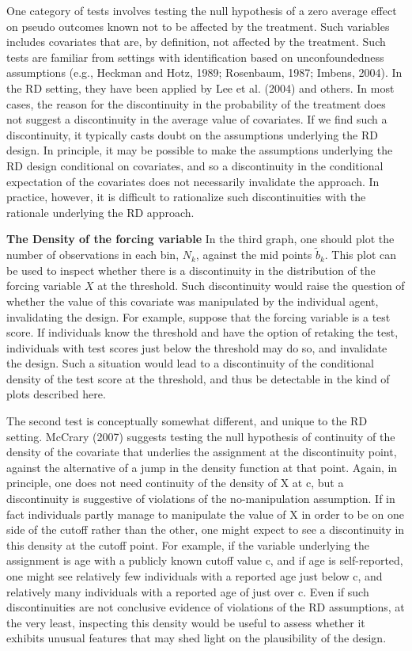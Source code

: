 \documentclass[11pt]{book}%
\begin{document}
One category of tests involves testing the null hypothesis of a zero average effect on pseudo outcomes known not to be affected by the treatment. Such variables includes covariates that are, by definition, not affected by the treatment. Such tests are familiar from settings with identification based on unconfoundedness assumptions (e.g., Heckman and Hotz, 1989; Rosenbaum, 1987; Imbens, 2004). In the RD setting, they have been applied by Lee et al. (2004) and others. In most cases, the reason for the discontinuity in the probability of the treatment does not suggest a discontinuity in the average value of covariates. If we find such a discontinuity, it typically casts doubt on the assumptions underlying the RD design. In principle, it may be possible to make the assumptions underlying the RD design conditional on covariates, and so a discontinuity in the conditional expectation of the covariates does not necessarily invalidate the approach. In practice, however, it is difficult to rationalize such discontinuities with the rationale underlying the RD approach.


\textbf{The Density of the forcing variable}
In the third graph, one should plot the number of observations in each bin, $N_{k}$, against the mid points $\tilde{b}_{k}$. This plot can be used to inspect whether there is a discontinuity in the distribution of the forcing variable $X$ at the threshold. Such discontinuity would raise the question of whether the value of this covariate was manipulated by the individual agent, invalidating the design. For example, suppose that the forcing variable is a test score. If individuals know the threshold and have the option of retaking the test, individuals with test scores just below the threshold may do so, and invalidate the design. Such a situation would lead to a discontinuity of the conditional density of the test score at the threshold, and thus be detectable in the kind of plots described here. 

The second test is conceptually somewhat different, and unique to the RD setting. McCrary (2007) suggests testing the null hypothesis of continuity of the density of the covariate that underlies the assignment at the discontinuity point, against the alternative of a jump in the density function at that point. Again, in principle, one does not need continuity of the density of X at c, but a discontinuity is suggestive of violations of the no-manipulation assumption. If in fact individuals partly manage to manipulate the value of X in order to be on one side of the cutoff rather than the other, one might expect to see a discontinuity in this density at the cutoff point. For example, if the variable underlying the assignment is age with a publicly known cutoff value c, and if age is self-reported, one might see relatively few individuals with a reported age just below c, and relatively many individuals with a reported age of just over c. Even if such discontinuities are not conclusive evidence of violations of the RD assumptions, at the very least, inspecting this density would be useful to assess whether it exhibits unusual features that may shed light on the plausibility of the design.
\end{document}
